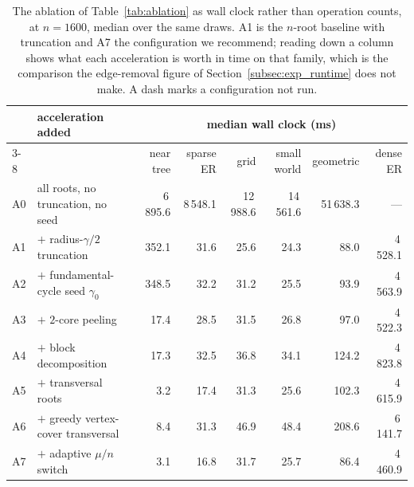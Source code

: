 
\begin{table}[ht]
\centering
\footnotesize
\setlength{\tabcolsep}{4pt}
\begin{tabular}{|l|l|r|r|r|r|r|r|}
\hline
 & \textbf{acceleration added} & \multicolumn{6}{c|}{\textbf{median wall clock (ms)}} \\ \cline{3-8}
 & & near tree & sparse ER & grid & small world & geometric & dense ER \\ \hline
A0 & all roots, no truncation, no seed & 6\,895.6 & 8\,548.1 & 12\,988.6 & 14\,561.6 & 51\,638.3 & --- \\ \hline
A1 & $+$ radius-$\gamma/2$ truncation & 352.1 & 31.6 & 25.6 & 24.3 & 88.0 & 4\,528.1 \\ \hline
A2 & $+$ fundamental-cycle seed $\gamma_0$ & 348.5 & 32.2 & 31.2 & 25.5 & 93.9 & 4\,563.9 \\ \hline
A3 & $+$ $2$-core peeling & 17.4 & 28.5 & 31.5 & 26.8 & 97.0 & 4\,522.3 \\ \hline
A4 & $+$ block decomposition & 17.3 & 32.5 & 36.8 & 34.1 & 124.2 & 4\,823.8 \\ \hline
A5 & $+$ transversal roots & 3.2 & 17.4 & 31.3 & 25.6 & 102.3 & 4\,615.9 \\ \hline
A6 & $+$ greedy vertex-cover transversal & 8.4 & 31.3 & 46.9 & 48.4 & 208.6 & 6\,141.7 \\ \hline
A7 & $+$ adaptive $\mu/n$ switch & 3.1 & 16.8 & 31.7 & 25.7 & 86.4 & 4\,460.9 \\ \hline
\end{tabular}
\caption{The ablation of Table~\ref{tab:ablation} as wall clock rather than
operation counts, at $n=1600$, median over the same draws.
A1 is the $n$-root baseline with truncation and A7 the configuration we
recommend; reading down a column shows what each acceleration is worth in time
on that family, which is the comparison the edge-removal figure of
Section~\ref{subsec:exp_runtime} does not make. A dash marks a configuration
not run.}
\label{tab:ablation_time}
\end{table}
